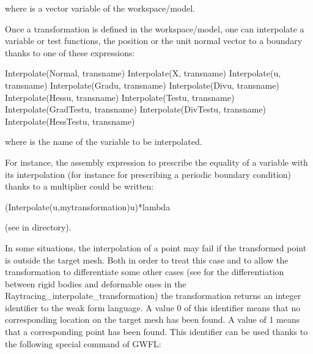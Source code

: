 \documentclass[a4paper,11pt,english]{sphinxmanual}
\begin{document}
where  is a vector variable of the workspace/model.

Once a transformation is defined in the workspace/model, one can interpolate a variable or test functions, the position or the unit normal vector to a boundary thanks to one of these expressions:

\begin{sphinxVerbatim}[commandchars=\\\{\}]
Interpolate(Normal, transname)
Interpolate(X, transname)
Interpolate(u, transname)
Interpolate(Grad\PYGZus{}u, transname)
Interpolate(Div\PYGZus{}u, transname)
Interpolate(Hess\PYGZus{}u, transname)
Interpolate(Test\PYGZus{}u, transname)
Interpolate(Grad\PYGZus{}Test\PYGZus{}u, transname)
Interpolate(Div\PYGZus{}Test\PYGZus{}u, transname)
Interpolate(Hess\PYGZus{}Test\PYGZus{}u, transname)
\end{sphinxVerbatim}

where  is the name of the variable to be interpolated.

For instance, the assembly expression to prescribe the equality of a variable  with its interpolation (for instance for prescribing a periodic boundary condition) thanks to a multiplier  could be written:

\begin{sphinxVerbatim}[commandchars=\\\{\}]
(Interpolate(u,my\PYGZus{}transformation)\PYGZhy{}u)*lambda
\end{sphinxVerbatim}

(see  in  directory).

In some situations, the interpolation of a point may fail if the transformed point is outside the target mesh. Both in order to treat this case and to allow the transformation to differentiate some other cases (see {\hyperref[\detokenize{userdoc/model_contact_friction_large_sliding:ud-model-contact-friction-raytrace-inter-trans}]{}} for the differentiation between rigid bodies and deformable ones in the Raytracing\_interpolate\_transformation) the transformation returns an integer identifier to the weak form language. A value 0 of this identifier means that no corresponding location on the target mesh has been found. A value of 1 means that a corresponding point has been found. This identifier can be used thanks to the following special command of GWFL:
\end{document}
